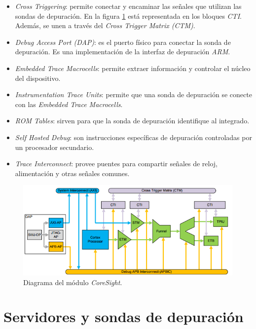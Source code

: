 \begin{itemize}
    \item \emph{Cross Triggering}: permite conectar y encaminar las señales que utilizan las sondas de depuración.
        En la figura \ref{fig:coresight} está representada en los bloques \emph{CTI}.
        Además, se unen a través del \emph{Cross Trigger Matrix (CTM)}.
    \item \emph{Debug Access Port (DAP)}: es el puerto físico para conectar la sonda de depuración. Es una implementación de la interfaz de depuración \emph{ARM}.
    \item \emph{Embedded Trace Macrocells}: permite extraer información y controlar el núcleo del dispositivo.
    \item \emph{Instrumentation Trace Units}: permite que una sonda de depuración se conecte con las \emph{Embedded Trace Macrocells}.
    \item \emph{ROM Tables}: sirven para que la sonda de depuración identifique al integrado.
    \item \emph{Self Hosted Debug}: son instrucciones específicas de depuración controladas por un procesador secundario.
    \item \emph{Trace Interconnect}: provee puentes para compartir señales de reloj, alimentación y otras señales comunes.
\end{itemize}

\begin{figure}[htbp]
	\centering
	\includegraphics[width=\textwidth]{./Figures/coresight.png}
    \caption{Diagrama del módulo \emph{CoreSight}\protect\footnotemark.}
	\label{fig:coresight}
\end{figure}

\section{Servidores y sondas de depuración}
\label{sec:depuracion}

